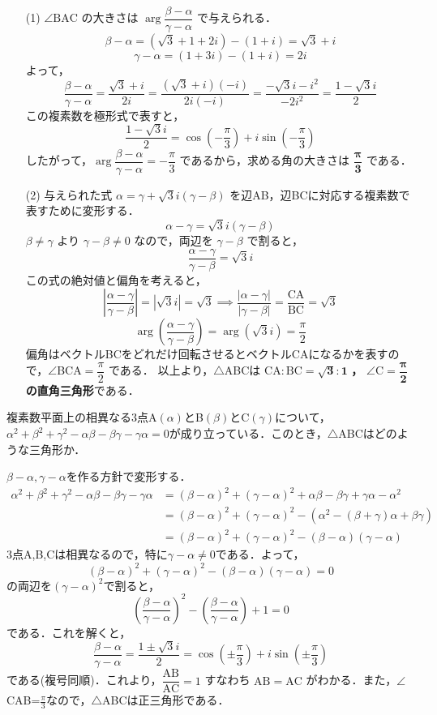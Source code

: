 \documentclass[a4paper,11pt]{ltjsarticle}
\begin{document}
\begin{itemize}
    \item [(1)] $\angle\mathrm{BAC}$ の大きさは $\arg\dfrac{\beta-\alpha}{\gamma-\alpha}$ で与えられる．
    \[\beta-\alpha=(\sqrt3+1+2i)-(1+i)=\sqrt3+i\]
    \[\gamma-\alpha=(1+3i)-(1+i)=2i\]
    よって，
    \[\frac{\beta-\alpha}{\gamma-\alpha}=\frac{\sqrt3+i}{2i}=\frac{(\sqrt3+i)(-i)}{2i(-i)}=\frac{-\sqrt3i-i^2}{-2i^2}=\frac{1-\sqrt3i}{2}\]
    この複素数を極形式で表すと，
    \[\frac{1-\sqrt3i}{2}=\cos\left(-\frac\pi3\right)+i\sin\left(-\frac\pi3\right)\]
    したがって，$\arg\dfrac{\beta-\alpha}{\gamma-\alpha}=-\dfrac\pi3$ であるから，求める角の大きさは $\boldsymbol{\dfrac\pi3}$ である．
    \item[(2)] 与えられた式 $\alpha=\gamma+\sqrt3i(\gamma-\beta)$ を辺AB，辺BCに対応する複素数で表すために変形する．
    \[\alpha-\gamma=\sqrt3i(\gamma-\beta)\]
    $\beta\neq\gamma$ より $\gamma-\beta\neq0$ なので，両辺を $\gamma-\beta$ で割ると，
    \[\frac{\alpha-\gamma}{\gamma-\beta}=\sqrt3i\]
    この式の絶対値と偏角を考えると，
    \[\left|\frac{\alpha-\gamma}{\gamma-\beta}\right|=|\sqrt3i|=\sqrt3 \implies \frac{|\alpha-\gamma|}{|\gamma-\beta|}=\frac{\mathrm{CA}}{\mathrm{BC}}=\sqrt3\]
    \[\arg\left(\frac{\alpha-\gamma}{\gamma-\beta}\right)=\arg(\sqrt3i)=\frac\pi2\]
    偏角はベクトルBCをどれだけ回転させるとベクトルCAになるかを表すので，$\angle$BCA$=\dfrac\pi2$ である．
    以上より，$\triangle$ABCは $\boldsymbol{\mathrm{CA}:\mathrm{BC}=\sqrt3:1}$ \textbf{，} $\boldsymbol{\angle\mathrm{C}=\dfrac\pi2}$ \textbf{の直角三角形}である．
\end{itemize}

\newpage
\begin{toi}
複素数平面上の相異なる3点A$(\alpha)$とB$(\beta)$とC$(\gamma)$について，$\alpha^2+\beta^2+\gamma^2-
\alpha\beta-\beta\gamma-\gamma\alpha=0$が成り立っている．このとき，$\triangle$ABCはどのような三角形か．\\[5pt]
\end{toi}
\ans
$\beta-\alpha,\gamma-\alpha$を作る方針で変形する．
\begin{align*}
\alpha^2+\beta^2+\gamma^2-
\alpha\beta-\beta\gamma-\gamma\alpha&=(\beta-\alpha)^2+(\gamma-\alpha)^2+\alpha\beta-\beta\gamma+\gamma\alpha-\alpha^2\\
&=(\beta-\alpha)^2+(\gamma-\alpha)^2-(\alpha^2-(\beta+\gamma)\alpha+\beta\gamma)\\
&=(\beta-\alpha)^2+(\gamma-\alpha)^2-(\beta-\alpha)(\gamma-\alpha)
\end{align*}
3点A,B,Cは相異なるので，特に$\gamma-\alpha\neq0$である．よって，
\[(\beta-\alpha)^2+(\gamma-\alpha)^2-(\beta-\alpha)(\gamma-\alpha)=0\]
の両辺を$(\gamma-\alpha)^2$で割ると，
\[\left(\frac{\beta-\alpha}{\gamma-\alpha}\right)^2-\left(\frac{\beta-\alpha}{\gamma-\alpha}\right)+1=0\]
である．これを解くと，\[\frac{\beta-\alpha}{\gamma-\alpha}=\frac{1\pm\sqrt3i}{2}=\cos\left(\pm\frac\pi3\right)+i\sin\left(\pm\frac\pi3\right)\]
である(複号同順)．これより，$\dfrac{\mathrm{AB}}{\mathrm{AC}}=1$ すなわち $\mathrm{AB}=\mathrm{AC}$ がわかる．また，$\angle$CAB=$\frac\pi3$なので，$\triangle$ABCは$\boldsymbol{\textbf{正三角形}}$である．
\end{document}
